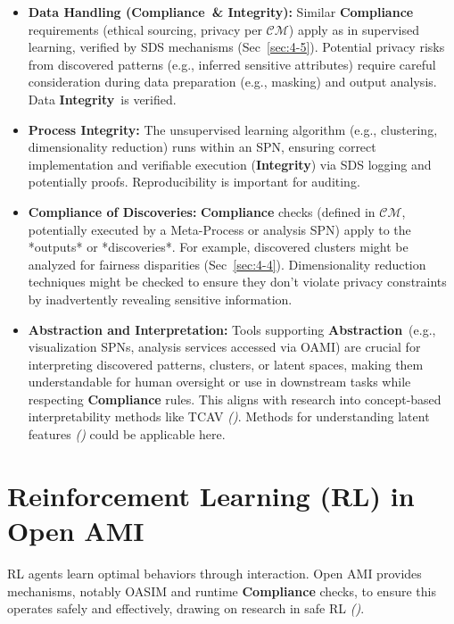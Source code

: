 \documentclass[12pt,a4paper]{report}
\renewcommand{\citep}[1]{\textit{\scriptsize{(\cite{#1})}}}
\newcommand{\Compliance}{\textbf{Compliance}}
\newcommand{\Integrity}{\textbf{Integrity}}
\newcommand{\Abstraction}{\textbf{Abstraction}}
\begin{document}
	\begin{itemize}
		\item \textbf{Data Handling (\Compliance\ \& \Integrity):} Similar \textbf{Compliance} requirements (ethical sourcing, privacy per $\mathcal{CM}$) apply as in supervised learning, verified by SDS mechanisms (Sec~\ref{sec:4-5}). Potential privacy risks from discovered patterns (e.g., inferred sensitive attributes) require careful consideration during data preparation (e.g., masking) and output analysis. Data \Integrity\ is verified.
		\item \textbf{Process Integrity:} The unsupervised learning algorithm (e.g., clustering, dimensionality reduction) runs within an SPN, ensuring correct implementation and verifiable execution (\Integrity) via SDS logging and potentially proofs. Reproducibility is important for auditing.
		\item \textbf{Compliance of Discoveries:} \textbf{Compliance} checks (defined in $\mathcal{CM}$, potentially executed by a Meta-Process or analysis SPN) apply to the *outputs* or *discoveries*. For example, discovered clusters might be analyzed for fairness disparities (Sec~\ref{sec:4-4}). Dimensionality reduction techniques might be checked to ensure they don't violate privacy constraints by inadvertently revealing sensitive information.
		\item \textbf{Abstraction and Interpretation:} Tools supporting \Abstraction\ (e.g., visualization SPNs, analysis services accessed via OAMI) are crucial for interpreting discovered patterns, clusters, or latent spaces, making them understandable for human oversight or use in downstream tasks while respecting \textbf{Compliance} rules. This aligns with research into concept-based interpretability methods like TCAV \citep{AdditionalCitationRef51}. Methods for understanding latent features \citep{Anthropic_Decompose_2023} could be applicable here.
	\end{itemize}
	
	\section{Reinforcement Learning (RL) in Open AMI} %
	\label{sec:3-5} %
	
	RL agents learn optimal behaviors through interaction. Open AMI provides mechanisms, notably OASIM and runtime \textbf{Compliance} checks, to ensure this operates safely and effectively, drawing on research in safe RL \citep{Constraint_RL_Survey_2024}.
	
\end{document}
